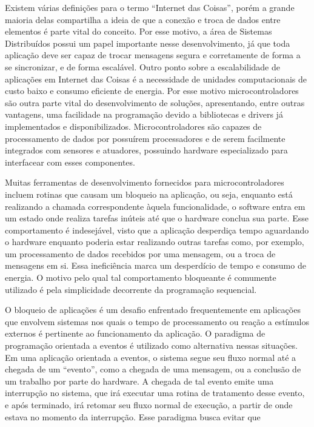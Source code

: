 \documentclass[11pt]{article}
\begin{document}
\tab Existem várias definições para o termo “Internet das
Coisas”, porém a grande maioria delas compartilha a ideia de que a conexão e troca de dados
entre elementos é parte vital do conceito. Por esse motivo, a área de Sistemas Distribuídos possui um
papel importante nesse desenvolvimento, já que toda aplicação deve ser capaz de trocar
mensagens segura e corretamente de forma a se sincronizar, e de forma escalável.\cite{singh2014}\cite{wortmann2015}\cite{chui2010}
Outro ponto sobre a escalabilidade de aplicações em Internet das Coisas é a necessidade de unidades
computacionais de custo baixo e consumo eficiente de energia. Por esse motivo microcontroladores
são outra parte vital do desenvolvimento de soluções, apresentando, entre outras vantagens, uma
facilidade na programação devido a bibliotecas e drivers já implementados e disponibilizados.
Microcontroladores são capazes de processamento de dados por possuírem processadores e de
serem facilmente integrados com sensores e atuadores, possuindo hardware especializado para
interfacear com esses componentes.\cite{edwards1997}
\par Muitas ferramentas de desenvolvimento fornecidos para microcontroladores incluem rotinas que causam um bloqueio na
aplicação, ou seja, enquanto está realizando a chamada correspondente àquela funcionalidade, o
software entra em um estado onde realiza tarefas inúteis até que o hardware conclua sua
parte. Esse comportamento é indesejável, visto que a aplicação desperdiça tempo aguardando o
hardware enquanto poderia estar realizando outras tarefas como, por exemplo, um processamento de
dados recebidos por uma mensagem, ou a troca de mensagens em si. Essa ineficiência marca um
desperdício de tempo e consumo de energia. O motivo pelo qual tal comportamento bloqueante é comumente utilizado é pela simplicidade decorrente da programação sequencial.
\par O bloqueio de aplicações é um desafio enfrentado frequentemente em aplicações que envolvem
sistemas nos quais o tempo de processamento ou reação a estímulos externos é pertinente ao
funcionamento da aplicação. O paradigma de programação orientada a eventos é utilizado como alternativa nessas situações. Em uma aplicação orientada a eventos, o sistema segue
seu fluxo normal até a chegada de um “evento”, como a chegada de uma mensagem, ou a conclusão
de um trabalho por parte do hardware. A chegada de tal evento emite uma interrupção no sistema, que
irá executar uma rotina de tratamento desse evento, e após terminado, irá retomar seu fluxo normal
de execução, a partir de onde estava no momento da interrupção. Esse paradigma busca evitar que
\end{document}
